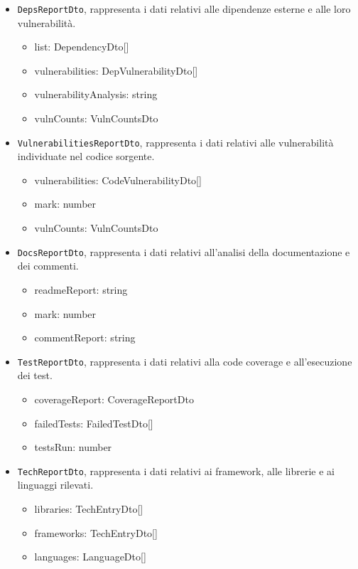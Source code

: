 \documentclass[a4paper, 11pt]{article}
\begin{document}
\begin{itemize}
\begin{itemize}
      \item \texttt{DepsReportDto}, rappresenta i dati relativi alle dipendenze esterne e alle loro vulnerabilità.
      \begin{itemize}
          \item list: DependencyDto[]
          \item vulnerabilities: DepVulnerabilityDto[]
          \item vulnerabilityAnalysis: string
          \item vulnCounts: VulnCountsDto
      \end{itemize}

      \item \texttt{VulnerabilitiesReportDto}, rappresenta i dati relativi alle vulnerabilità individuate nel codice sorgente.
      \begin{itemize}
          \item vulnerabilities: CodeVulnerabilityDto[]
          \item mark: number
          \item vulnCounts: VulnCountsDto
      \end{itemize}

      \item \texttt{DocsReportDto}, rappresenta i dati relativi all'analisi della documentazione e dei commenti.
      \begin{itemize}
          \item readmeReport: string
          \item mark: number
          \item commentReport: string
      \end{itemize}

      \item \texttt{TestReportDto}, rappresenta i dati relativi alla code coverage e all'esecuzione dei test.
      \begin{itemize}
          \item coverageReport: CoverageReportDto
          \item failedTests: FailedTestDto[]
          \item testsRun: number
      \end{itemize}

      \item \texttt{TechReportDto}, rappresenta i dati relativi ai framework, alle librerie e ai linguaggi rilevati.
      \begin{itemize}
          \item libraries: TechEntryDto[]
          \item frameworks: TechEntryDto[]
          \item languages: LanguageDto[]
      \end{itemize}


\end{itemize}
\end{itemize}
\end{document}
